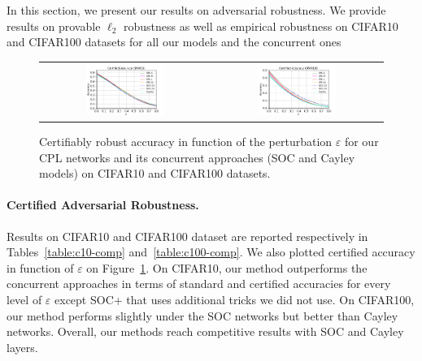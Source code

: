 In this section, we present our results on adversarial robustness.
We provide results on provable $\ell_2$ robustness as well as empirical robustness on CIFAR10 and CIFAR100 datasets for all our models and the concurrent ones

\begin{figure}[h]
    \centering
    \begin{tabular}{cc}
    \includegraphics[width =0.48\textwidth]{sections/4_certification/images/cert_acc_eps_c10.pdf} & \includegraphics[width =0.48\textwidth]{sections/4_certification/images/cert_acc_eps_c100.pdf}
    \end{tabular}
    \caption{Certifiably robust accuracy in function of the perturbation $\varepsilon$ for our CPL networks and its concurrent approaches (SOC and Cayley models) on CIFAR10 and CIFAR100 datasets.}
    \label{fig:cert-acc}
\end{figure}

\paragraph{Certified Adversarial Robustness.} 
Results on CIFAR10 and CIFAR100 dataset are reported respectively in Tables~\ref{table:c10-comp} and~\ref{table:c100-comp}. We also plotted certified accuracy in function of $\varepsilon$ on Figure~\ref{fig:cert-acc}. On CIFAR10, our method outperforms the concurrent approaches in terms of standard and certified accuracies for every level of $\varepsilon$ except SOC+ that uses additional tricks we did not use. On CIFAR100, our method performs slightly under the SOC networks but better than Cayley networks. Overall, our methods reach competitive results with SOC and Cayley layers. 

